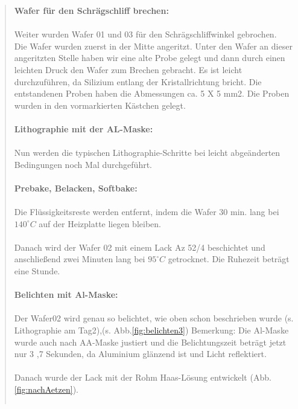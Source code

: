 \begin{quote}
    	\textbf{Wafer für den Schrägschliff brechen:}\\
 		\\
		Weiter wurden Wafer 01 und 03 für den Schrägschliffwinkel gebrochen.\\
		Die Wafer wurden zuerst in der Mitte angeritzt. Unter den Wafer an
		dieser angeritzten Stelle haben wir eine alte Probe gelegt und dann
		durch einen leichten Druck den Wafer zum Brechen gebracht. Es ist leicht
		durchzuführen, da Silizium entlang der Kristallrichtung bricht. Die
		entstandenen Proben haben die Abmessungen ca. 5 X 5 mm2. Die Proben
		wurden in den vormarkierten Kästchen gelegt.\\
		\\
		\textbf{Lithographie mit der AL-Maske:}\\
		\\
		Nun werden die typischen Lithographie-Schritte bei leicht abgeänderten
		Bedingungen noch Mal durchgeführt.\\
		\\
		\textbf{Prebake, Belacken, Softbake:} \\
		\\
		Die Flüssigkeitsreste werden entfernt, indem die Wafer 30 min. lang bei
		$140^{\circ}C$ auf der Heizplatte liegen bleiben.\\
		\\
		Danach wird der Wafer 02 mit einem Lack  Az 52/4 beschichtet und
		anschließend zwei Minuten lang bei $95^{\circ}C$ getrocknet. Die Ruhezeit
		beträgt eine Stunde.\\
		\\
		\textbf{Belichten mit Al-Maske:}\\
		\\
		Der Wafer02 wird genau so belichtet, wie oben schon beschrieben wurde
		(s. Lithographie am Tag2),(s. Abb.\ref{fig:belichten3}) Bemerkung: Die
		Al-Maske wurde auch nach AA-Maske justiert und die Belichtungszeit
		beträgt jetzt nur 3 ,7 Sekunden, da Aluminium glänzend ist und Licht
		reflektiert.\\
		\\
 		Danach wurde der Lack mit der Rohm Haas-Lösung entwickelt
 		(Abb. \ref{fig:nachAetzen}).

    	\vspace{2em}

    		\begin{center}
                \begin{tabular}{ll}


\end{tabular}
\end{center}
\end{quote}
